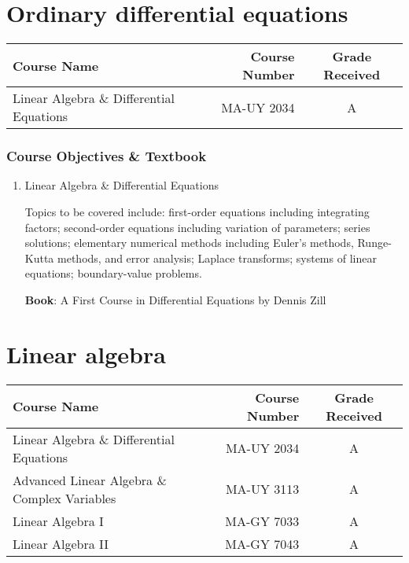 \documentclass[11pt]{article}
\begin{document}
\section*{Ordinary differential equations}

\begin{center}
\begin{tabular}{lrc}
Course Name & Course Number & Grade Received \\ \toprule
Linear Algebra \& Differential Equations & MA-UY 2034 & A
\end{tabular}
\end{center}
\subsubsection*{Course Objectives \& Textbook}
\begin{enumerate}
    \item Linear Algebra \& Differential Equations
    
    Topics to be covered include: first-order equations including integrating factors; second-order equations including variation of parameters; series solutions; elementary numerical methods including Euler’s methods, Runge-Kutta methods, and error analysis; Laplace transforms; systems of linear equations; boundary-value problems.
    
    \textbf{Book}: A First Course in Differential Equations by Dennis Zill
\end{enumerate}

\section*{Linear algebra}

\begin{center}
\begin{tabular}{lrc}
Course Name & Course Number & Grade Received \\ \toprule
Linear Algebra \& Differential Equations & MA-UY 2034 & A \\
Advanced Linear Algebra \& Complex Variables & MA-UY 3113 & A \\
Linear Algebra I & MA-GY 7033 & A \\
Linear Algebra II & MA-GY 7043 & A
\end{tabular}
\end{center}
\end{document}
